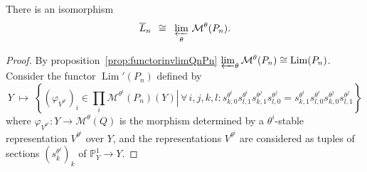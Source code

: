 \documentclass[ALCO,ThmDefs,Unicode,epreuves]{cedram}
\def\phi{\varphi}
\def\P{\mathds P}
\DeclareMathOperator{\Lim}{Lim}
\begin{document}
\begin{theo}\label{thm:Ln-limPn}
There is an isomorphism 
\[\overline{L}_n\;\,\cong\;\;\varprojlim_\theta\,\mathcal M^\theta(P_n).\]
\end{theo}
\begin{proof}
By proposition~\ref{prop:functorinvlimQnPn} 
$\varprojlim_\theta\mathcal M^\theta(P_n)\cong\Lim(P_n)$.
Consider the functor $\Lim'(P_n)$ defined by
\[\textstyle
Y\;\mapsto\;
\left\{
(\phi_{V^{\theta^i}})_i\in\prod_i\mathcal M^{\theta^i}(P_n)(Y)
\left|\,
\forall\,i,j,k,l\colon
s^{\theta^i}_{k,0}s^{\theta^i}_{l,1}s^{\theta^j}_{k,1}s^{\theta^j}_{l,0}
=s^{\theta^i}_{k,1}s^{\theta^i}_{l,0}s^{\theta^j}_{k,0}s^{\theta^j}_{l,1}
\right.\right\}
\]
where $\phi_{V^{\theta^i}}\colon Y\to\mathcal M^\theta(Q)$ is the morphism determined by a
$\theta^i$-stable representation $V^{\theta^i}$ over $Y$, and the representations
$V^{\theta^i}$ are considered as tuples of sections $(s^{\theta^i}_k)_k$ of $\P^1_Y\to Y$.


\end{proof}
\end{document}
